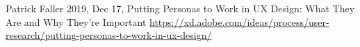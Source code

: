 \begin{thebibliography}{9} 
    Patrick Faller
    2019, Dec 17,
    Putting Personas to Work in UX Design: What They Are and Why They’re Important
    \url{https://xd.adobe.com/ideas/process/user-research/putting-personas-to-work-in-ux-design/}
\end{thebibliography}
